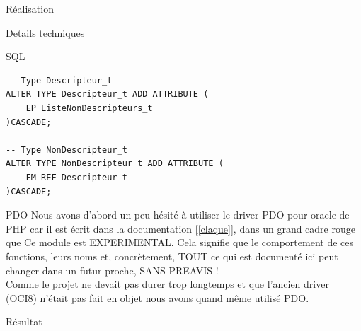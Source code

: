 \documentclass[a4paper, 12pt]{report}
\begin{document}
\begin{chapter}{Réalisation}
\begin{section}{Details techniques}
\begin{subsection}{SQL}
\begin{verbatim}
-- Type Descripteur_t
ALTER TYPE Descripteur_t ADD ATTRIBUTE (
    EP ListeNonDescripteurs_t
)CASCADE;

-- Type NonDescripteur_t
ALTER TYPE NonDescripteur_t ADD ATTRIBUTE (
    EM REF Descripteur_t
)CASCADE;
			\end{verbatim}
		\end{subsection}

		\begin{subsection}{PDO}	
			Nous avons d'abord un peu hésité à utiliser le driver PDO pour oracle de PHP car il est écrit dans la documentation [\ref{claque}], 
			dans un grand cadre rouge que \og Ce module est EXPERIMENTAL. Cela signifie que le comportement de ces fonctions, leurs noms et, concrètement, TOUT ce qui est documenté ici peut changer dans un futur proche, SANS PREAVIS ! \fg \\
			Comme le projet ne devait pas durer trop longtemps et que l'ancien driver (OCI8) n'était pas fait en objet nous avons quand même utilisé PDO.
		\end{subsection}
	\end{section}
\end{chapter}

\begin{chapter}{Résultat}
\end{chapter}
\end{document}
